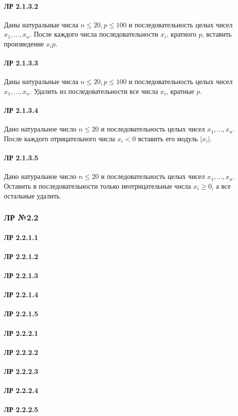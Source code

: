 \documentclass[12pt,a4paper]{report}
\begin{document}
\paragraph*{ЛР 2.1.3.2} Даны натуральные числа $n \le 20, p \le 100$ и последовательность целых чисел $x_1, ..., x_n$. После каждого  числа последовательности $x_i$, кратного $p$, вставить произведение $x_i p$.
\paragraph*{ЛР 2.1.3.3} Даны натуральные числа $n \le 20, p \le 100$ и последовательность целых чисел $x_1, ..., x_n$. Удалить из последовательности все числа $x_i$, кратные $p$.
\paragraph*{ЛР 2.1.3.4} Дано натуральное число $n \le 20$ и последовательность целых чисел $x_1, ..., x_n$. После каждого отрицательного числа $x_i<0$ вставить его модуль $|x_i|$.
\paragraph*{ЛР 2.1.3.5} Дано натуральное число $n \le 20$ и последовательность целых чисел $x_1, ..., x_n$. Оставить в последовательности только неотрицательные числа $x_i \ge 0$, а все остальные удалить.

\clearpage
\subsubsection*{ЛР №2.2}
\paragraph*{ЛР 2.2.1.1}
\paragraph*{ЛР 2.2.1.2}
\paragraph*{ЛР 2.2.1.3}
\paragraph*{ЛР 2.2.1.4}
\paragraph*{ЛР 2.2.1.5}
\paragraph*{ЛР 2.2.2.1}
\paragraph*{ЛР 2.2.2.2}
\paragraph*{ЛР 2.2.2.3}
\paragraph*{ЛР 2.2.2.4}
\paragraph*{ЛР 2.2.2.5}
\end{document}
